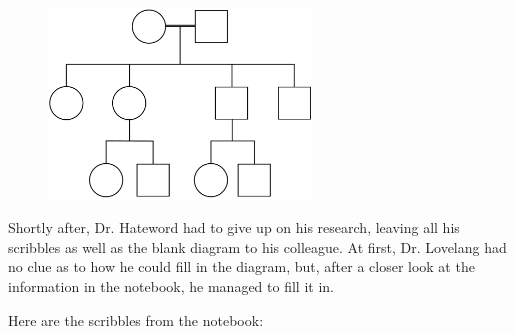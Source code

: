 \begin{refsection}
\begin{problem}{\langnameTabaq}{\nameDMirea}{}
\begin{figure}[H]
\includegraphics[width = 7cm]{figures/Tabaq.pdf}
\end{figure}

Shortly after, Dr. Hateword had to give up on his research, leaving all his scribbles as well as the blank diagram to his colleague. At first, Dr. Lovelang had no clue as to how he could fill in the diagram, but, after a closer look at the information in the notebook, he managed to fill it in.

Here are the scribbles from the notebook:
\begin{multicols}{2}
\begin{description}[font=\normalfont,leftmargin=!,labelwidth={\widthof{Nadwah:}}]
    \item[Rowa:]  \\  \\ 
    
    \item[Kuwa:]  \\  \\ 
    
    \item[Salva:]  \\  \\ 
    
    \item[Sihan:]  \\  \\ 
    
    \item[Malak:]  \\  \\ 
    

\end{description}
\end{multicols}
\end{problem}
\end{refsection}
